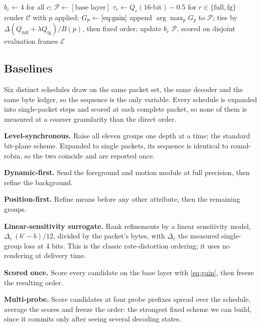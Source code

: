 \documentclass[lettersize,journal]{IEEEtran}
\begin{document}
\begin{algorithm}[t]
\caption{Prefix-objective ordering on calibration frames}
\label{alg:direct}
\small
\begin{algorithmic}[1]
\State $b_c\leftarrow 4$ for all $c$; $\mathcal{P}\leftarrow[\text{base layer}]$
\State $\tau_r\leftarrow Q_r(\text{16-bit})-0.5$ for $r\in\{\text{full},\text{fg}\}$
    \State render $\mathcal{C}$ with $p$ applied; $G_p\leftarrow\eqref{eq:gain}$
  \EndFor
  \State append $\arg\max_p G_p$ to $\mathcal{P}$; ties by $\Delta(Q_{\text{full}}+\lambda Q_{\text{fg}})/B(p)$, then fixed order; update $b_c$
\EndWhile
\State \Return $\mathcal{P}$, scored on disjoint evaluation frames $\mathcal{E}$
\end{algorithmic}
\end{algorithm}

\subsection{Baselines}
\label{sec:baselines}
Six distinct schedules draw on the same packet set, the same decoder and the same
byte ledger, so the sequence is the only variable. Every schedule is expanded
into single-packet steps and scored at each complete packet, so none of them is
measured at a coarser granularity than the direct order.

\textbf{Level-synchronous.} Raise all eleven groups one depth at a time; the
standard bit-plane scheme. Expanded to single packets, its sequence is identical
to round-robin, so the two coincide and are reported once.

\textbf{Dynamic-first.} Send the foreground and motion module at full precision,
then refine the background.

\textbf{Position-first.} Refine means before any other attribute, then the
remaining groups.

\textbf{Linear-sensitivity surrogate.} Rank refinements by a linear sensitivity
model, $\Delta_c\,(b'-b)/12$, divided by the packet's bytes, with $\Delta_c$ the
measured single-group loss at 4 bits. This is the classic rate-distortion
ordering; it uses no rendering at delivery time.

\textbf{Scored once.} Score every candidate on the base layer with
\eqref{eq:gain}, then freeze the resulting order.

\textbf{Multi-probe.} Score candidates at four probe prefixes spread over the
schedule, average the scores and freeze the order: the strongest fixed scheme we
can build, since it commits only after seeing several decoding states.
\end{document}
